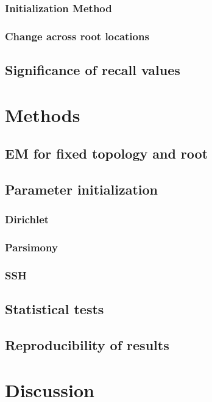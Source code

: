 \documentclass[]{article}
\begin{document}
			\subsubsection{Initialization Method}
			\subsubsection{Change across root locations}				
		\subsection{Significance of recall values}
		
	\section{Methods}		
		\subsection{EM for fixed topology and root}
		\subsection{Parameter initialization}
		\subsubsection{Dirichlet}
		\subsubsection{Parsimony}
		\subsubsection{SSH}
		\subsection{Statistical tests}
		\subsection{Reproducibility of results}
	\section{Discussion}	
	
\end{document}

